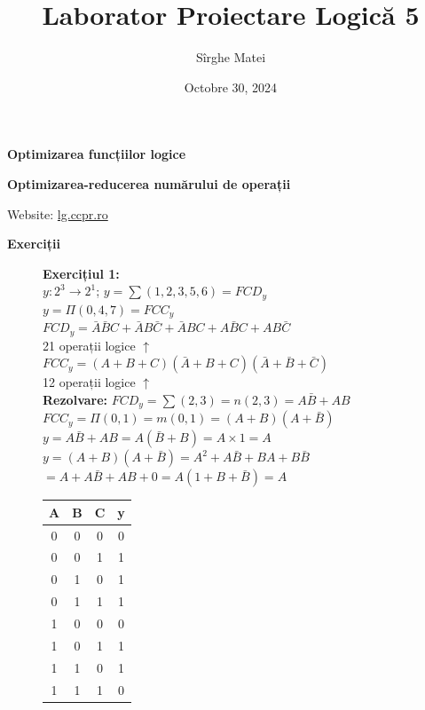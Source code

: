 \documentclass[12pt]{article}
\title{\bfseries Laborator Proiectare Logică 5}
\author{Sîrghe Matei}
\date{Octobre 30, 2024}
\begin{document}
\maketitle

\begin{center}
    \large{\textbf{Optimizarea funcțiilor logice}}
\end{center}
\begin{center}
    \large{\textbf{Optimizarea-reducerea numărului de operații}}
\end{center}

Website: \href{https://lg.ccpr.ro/}{lg.ccpr.ro}

\renewcommand{\arraystretch}{1}

\begin{center}
    \textbf{Exerciții}
\end{center}

\begin{figure}[h!]
    \begin{minipage}{0.8\textwidth}
        \textbf{Exercițiul 1:\\}
        $y: 2^3 \rightarrow 2^1$;
        $y = \sum(1,2,3,5,6)=FCD_{y}$\\
        $y = \Pi(0,4,7)=FCC_{y} $\\
        $FCD_{y}=\bar{A}\bar{B}C+\bar{A}B\bar{C}+\bar{A}BC+A\bar{B}C+AB\bar{C}$\\
        21 operații logice $\uparrow$\\
        $FCC_{y}=(A+B+C)(\bar{A}+B+C)(\bar{A}+\bar{B}+\bar{C})$\\
        12 operații logice $\uparrow$\\
        \textbf{Rezolvare:}
        $FCD_{y}=\sum(2,3)=n(2,3)=A\bar{B}+AB$\\
        $ FCC_{y}=\Pi(0,1)=m(0,1)=(A+B)(A+\bar{B}) $\\
        $ y= A\bar{B}+AB=A(\bar{B}+B)=A\times1=A$\\
        $y=(A+B)(A+\bar{B})=A^2+A\bar{B}+BA+B\bar{B}$\\
        $ =A+A\bar{B}+AB+0=A(1+B+\bar{B})=A$\\
    \end{minipage}
    \hfill
    \begin{minipage}{0.18\textwidth}
        \begin{tabular}{|c|c|c|c|}
            \hline
            A & B & C & y \\ \hline
            0 & 0 & 0 & 0 \\ \hline
            0 & 0 & 1 & 1 \\ \hline
            0 & 1 & 0 & 1 \\ \hline
            0 & 1 & 1 & 1 \\ \hline
            1 & 0 & 0 & 0 \\ \hline
            1 & 0 & 1 & 1 \\ \hline
            1 & 1 & 0 & 1 \\ \hline
            1 & 1 & 1 & 0 \\ \hline
        \end{tabular}
    \end{minipage}
\end{figure}
\end{document}
